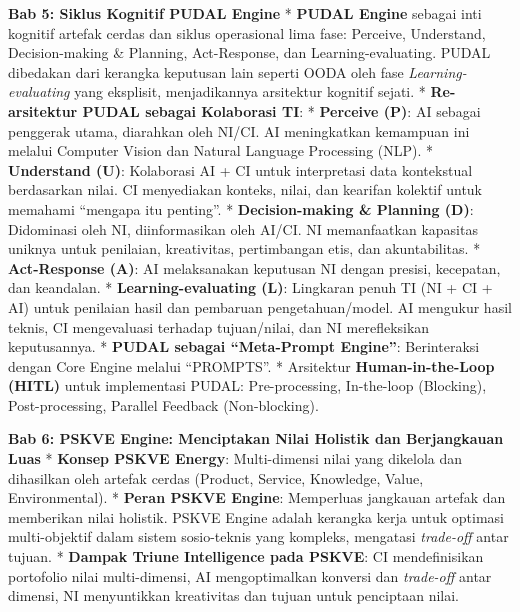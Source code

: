 \documentclass[
  letterpaper,
  DIV=11,
  numbers=noendperiod]{scrreprt}
\begin{document}
\textbf{Bab 5: Siklus Kognitif PUDAL Engine} * \textbf{PUDAL Engine}
sebagai inti kognitif artefak cerdas dan siklus operasional lima fase:
Perceive, Understand, Decision-making \& Planning, Act-Response, dan
Learning-evaluating. PUDAL dibedakan dari kerangka keputusan lain
seperti OODA oleh fase \emph{Learning-evaluating} yang eksplisit,
menjadikannya arsitektur kognitif sejati. * \textbf{Re-arsitektur PUDAL
sebagai Kolaborasi TI}: * \textbf{Perceive (P)}: AI sebagai penggerak
utama, diarahkan oleh NI/CI. AI meningkatkan kemampuan ini melalui
Computer Vision dan Natural Language Processing (NLP). *
\textbf{Understand (U)}: Kolaborasi AI + CI untuk interpretasi data
kontekstual berdasarkan nilai. CI menyediakan konteks, nilai, dan
kearifan kolektif untuk memahami ``mengapa itu penting''. *
\textbf{Decision-making \& Planning (D)}: Didominasi oleh NI,
diinformasikan oleh AI/CI. NI memanfaatkan kapasitas uniknya untuk
penilaian, kreativitas, pertimbangan etis, dan akuntabilitas. *
\textbf{Act-Response (A)}: AI melaksanakan keputusan NI dengan presisi,
kecepatan, dan keandalan. * \textbf{Learning-evaluating (L)}: Lingkaran
penuh TI (NI + CI + AI) untuk penilaian hasil dan pembaruan
pengetahuan/model. AI mengukur hasil teknis, CI mengevaluasi terhadap
tujuan/nilai, dan NI merefleksikan keputusannya. * \textbf{PUDAL sebagai
``Meta-Prompt Engine''}: Berinteraksi dengan Core Engine melalui
``PROMPTS''. * Arsitektur \textbf{Human-in-the-Loop (HITL)} untuk
implementasi PUDAL: Pre-processing, In-the-loop (Blocking),
Post-processing, Parallel Feedback (Non-blocking).

\textbf{Bab 6: PSKVE Engine: Menciptakan Nilai Holistik dan Berjangkauan
Luas} * \textbf{Konsep PSKVE Energy}: Multi-dimensi nilai yang dikelola
dan dihasilkan oleh artefak cerdas (Product, Service, Knowledge, Value,
Environmental). * \textbf{Peran PSKVE Engine}: Memperluas jangkauan
artefak dan memberikan nilai holistik. PSKVE Engine adalah kerangka
kerja untuk optimasi multi-objektif dalam sistem sosio-teknis yang
kompleks, mengatasi \emph{trade-off} antar tujuan. * \textbf{Dampak
Triune Intelligence pada PSKVE}: CI mendefinisikan portofolio nilai
multi-dimensi, AI mengoptimalkan konversi dan \emph{trade-off} antar
dimensi, NI menyuntikkan kreativitas dan tujuan untuk penciptaan nilai.
\end{document}
